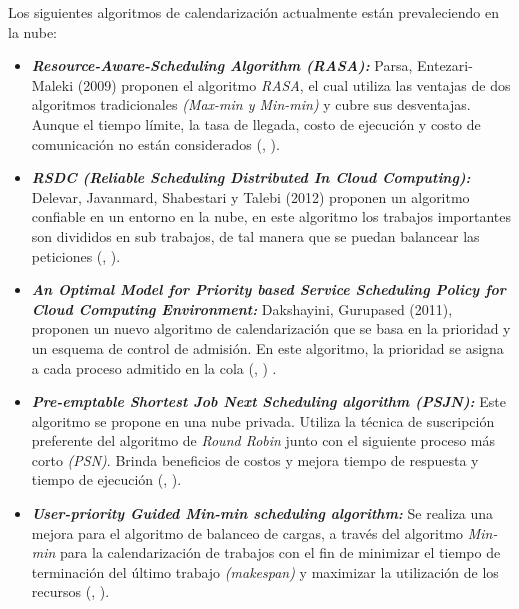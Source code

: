 Los siguientes algoritmos de calendarizaci\'on actualmente est\'an prevaleciendo en la nube:
\begin{itemize}
	\item \textit{\textbf{Resource-Aware-Scheduling Algorithm (RASA):}} Parsa, Entezari-Maleki (2009) proponen el algoritmo \textit{RASA}, el cual utiliza las ventajas de dos algoritmos tradicionales \textit{(Max-min y Min-min)} y cubre sus desventajas. Aunque el tiempo l\'imite, la tasa de llegada, costo de ejecución y costo de comunicaci\'on no est\'an considerados (\citeauthor{parsa2009rasa}, \citeyear{parsa2009rasa}).
	
	
	\item \textit{\textbf{RSDC (Reliable Scheduling Distributed In Cloud Computing):}} Delevar, Javanmard, Shabestari y Talebi (2012) proponen un algoritmo confiable en un entorno en la nube, en este algoritmo los trabajos importantes son divididos en sub trabajos, de tal manera que se puedan balancear las peticiones (\citeauthor{delavar2012rsdc}, \citeyear{delavar2012rsdc}).
	
	
	\item \textit{\textbf{An Optimal Model for Priority based Service Scheduling Policy for Cloud Computing Environment:}} Dakshayini, Gurupased (2011), proponen un nuevo algoritmo de calendarizaci\'on que se basa en la prioridad y un esquema de control de admisi\'on. En este algoritmo, la prioridad se asigna a cada proceso admitido en la cola (\citeauthor{dakshayini2011optimal}, \citeyear{dakshayini2011optimal}) . 
	
	
	\item \textit{\textbf{Pre-emptable Shortest Job Next Scheduling algorithm (PSJN):}}  Este algoritmo se propone en una nube privada. Utiliza la t\'ecnica de suscripci\'on preferente del algoritmo de \textit{Round Robin} junto con el siguiente proceso m\'as corto \textit{(PSN)}. Brinda beneficios de costos y mejora tiempo de respuesta y tiempo de ejecuci\'on (\citeauthor{nishant}, \citeyear{nishant}). 
	
	
	\item \textit{\textbf{User-priority Guided Min-min scheduling algorithm:}} Se realiza una mejora para el algoritmo de balanceo de cargas, a trav\'es del algoritmo \textit{Min-min} para la calendarizaci\'on de trabajos con el fin de minimizar el tiempo de terminaci\'on del \'ultimo trabajo \textit{(makespan)} y maximizar la utilizaci\'on de los recursos (\citeauthor{chen2013user}, \citeyear{chen2013user}). 
\end{itemize}



